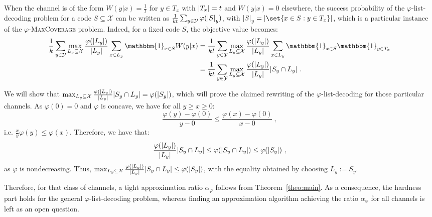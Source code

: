 When the channel is of the form $W(y|x) = \frac{1}{t}$ for $y \in T_x$ with $\abs{T_x}=t$ and $W(y|x) = 0$ elsewhere, the success probability of the $\varphi$-list-decoding problem for a code $S\subseteq \mathcal{X}$ can be written as $\frac{1}{kt}\sum_{y \in \mathcal{Y}}\varphi(\abs{S}_y)$, with $\abs{S}_y = \abs{\set{x \in S : y \in T_x}}$, which is a particular instance of the $\varphi$-\textsc{MaxCoverage} problem. Indeed, for a fixed code $S$, the objective value becomes:
\begin{equation}
  \begin{aligned}
    \frac{1}{k}\sum_{y \in \mathcal{Y}} \max_{L_y \subseteq \mathcal{X}} \frac{\varphi(|L_y|)}{|L_y|} \sum_{x \in L_y}\mathbbm{1}_{x \in S}W(y|x) &= \frac{1}{kt}\sum_{y \in \mathcal{Y}}\max_{L_y \subseteq \mathcal{X}}\frac{\varphi(\abs{L_y})}{\abs{L_y}}\sum_{x \in L_y}\mathbbm{1}_{x \in S}\mathbbm{1}_{y \in T_x}\\
    &= \frac{1}{kt}\sum_{y \in \mathcal{Y}}\max_{L_y \subseteq \mathcal{X}}\frac{\varphi(\abs{L_y})}{\abs{L_y}}\abs{S_y \cap L_y} \ .
    \end{aligned}
\end{equation}

We will show that $\max_{L_y \subseteq \mathcal{X}}\frac{\varphi(\abs{L_y})}{\abs{L_y}}\abs{S_y \cap L_y} = \varphi(\abs{S_y})$, which will prove the claimed rewriting of the $\varphi$-list-decoding for those particular channels. As $\varphi(0)=0$ and $\varphi$ is concave, we have for all $y \geq x \geq 0$:
\[ \frac{\varphi(y) - \varphi(0)}{y-0} \leq \frac{\varphi(x) - \varphi(0)}{x-0}  \ , \]
i.e. $\frac{x}{y}\varphi(y) \leq \varphi(x)$. Therefore, we have that:
\[ \frac{\varphi(\abs{L_y})}{\abs{L_y}}\abs{S_y \cap L_y} \leq \varphi(\abs{S_y \cap L_y}) \leq \varphi(\abs{S_y}) \ , \]
as $\varphi$ is nondecreasing. Thus, $\max_{L_y \subseteq \mathcal{X}}\frac{\varphi(\abs{L_y})}{\abs{L_y}}\abs{S_y \cap L_y} \leq \varphi(\abs{S_y})$, with the equality obtained by choosing $L_y := S_y$.

Therefore, for that class of channels, a tight approximation ratio $\alpha_{\varphi}$ follows from Theorem~\ref{theo:main}. As a consequence, the hardness part holds for the general $\varphi$-list-decoding problem, whereas finding an approximation algorithm achieving the ratio $\alpha_{\varphi}$ for all channels is left as an open question.
  

